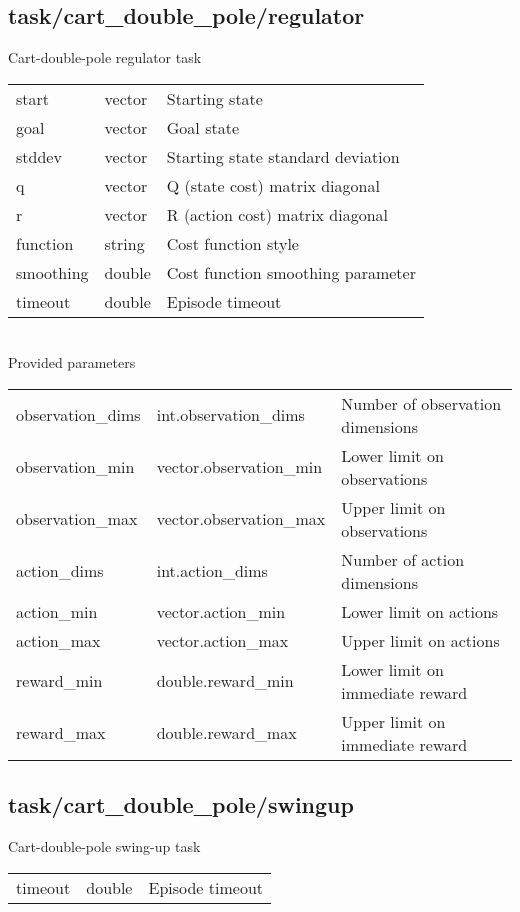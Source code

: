 \subsection{task/cart\_double\_pole/regulator}
\noindent Cart-double-pole regulator task\\

\noindent\begin{tabular}{@{}lll@{}}
start&vector&Starting state\\
goal&vector&Goal state\\
stddev&vector&Starting state standard deviation\\
q&vector&Q (state cost) matrix diagonal\\
r&vector&R (action cost) matrix diagonal\\
function&string&Cost function style\\
smoothing&double&Cost function smoothing parameter\\
timeout&double&Episode timeout\\
\end{tabular}
\\

\noindent Provided parameters\\

\noindent\begin{tabular}{@{}lll@{}}
observation\_dims&int.observation\_dims&Number of observation dimensions\\
observation\_min&vector.observation\_min&Lower limit on observations\\
observation\_max&vector.observation\_max&Upper limit on observations\\
action\_dims&int.action\_dims&Number of action dimensions\\
action\_min&vector.action\_min&Lower limit on actions\\
action\_max&vector.action\_max&Upper limit on actions\\
reward\_min&double.reward\_min&Lower limit on immediate reward\\
reward\_max&double.reward\_max&Upper limit on immediate reward\\
\end{tabular}
\subsection{task/cart\_double\_pole/swingup}
\noindent Cart-double-pole swing-up task\\

\noindent\begin{tabular}{@{}lll@{}}
timeout&double&Episode timeout\\
\end{tabular}
\\

